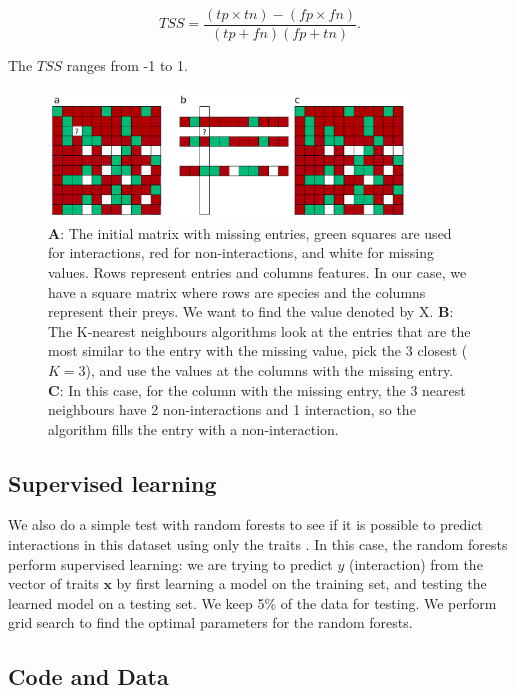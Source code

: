 \documentclass[letterpaper]{article}
\begin{document}
\begin{equation}
  TSS = \frac{(tp \times tn) - (fp \times fn)}{(tp + fn)(fp + tn)}.
\end{equation}

The $TSS$ ranges from -1 to 1.

\begin{figure}
  \centering\includegraphics[width=0.85\textwidth]{Figures/pearson.pdf}

  \caption{\textbf{A}: The initial matrix with missing entries, green squares
  are used for interactions, red for non-interactions, and white for missing
  values. Rows represent entries and columns features. In our case, we have a
  square matrix where rows are species and the columns represent their preys.
  We want to find the value denoted by X. \textbf{B}: The K-nearest neighbours
  algorithms look at the entries that are the most similar to the entry with
  the missing value, pick the 3 closest ($K = 3$), and use the values at the
  columns with the missing entry. \textbf{C}: In this case, for the column with
  the missing entry, the 3 nearest neighbours have 2 non-interactions and 1
  interaction, so the algorithm fills the entry with a non-interaction.}

  \label{fig:pearson}
\end{figure}

\subsection{Supervised learning}

We also do a simple test with random forests to see if it is possible to
predict interactions in this dataset using only the traits \cite{bre01b}. In
this case, the random forests perform supervised learning: we are trying to
predict $y$ (interaction) from the vector of traits $\mathbf{x}$ by first
learning a model on the training set, and testing the learned model on a
testing set. We keep 5\% of the data for testing. We perform grid search to
find the optimal parameters for the random forests.

\subsection{Code and Data}
\end{document}
